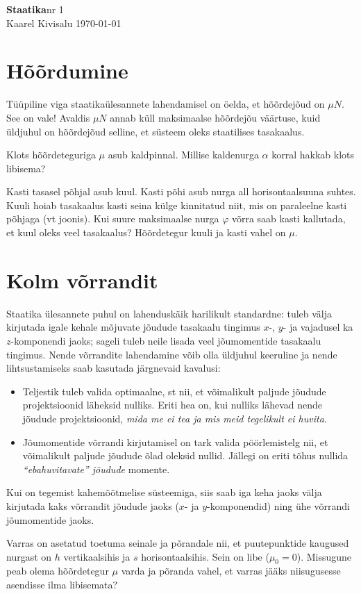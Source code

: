 \documentclass[a4paper,11pt,twocolumn]{article}
\begin{document}
{\huge \textbf{Staatika}\hfill \normalsize {nr 1}} \\
{Kaarel Kivisalu \hfill \today}

\section{Hõõrdumine}
Tüüpiline viga staatikaülesannete lahendamisel on öelda, et hõõrdejõud on $\mu N$. See on vale! Avaldis $\mu N$ annab küll maksimaalse hõõrdejõu väärtuse, kuid üldjuhul on hõõrdejõud selline, et süsteem oleks staatilises tasakaalus.
\begin{question}
Klots hõõrdeteguriga $\mu$ asub kaldpinnal. Millise kaldenurga $\alpha$ korral hakkab klots libisema?
\end{question}
\begin{question}[Lahtine 2006, V7][sta1][5cm]
	Kasti tasasel põhjal asub kuul. Kasti põhi asub nurga all horisontaalsuuna suhtes. Kuuli hoiab tasakaalus kasti seina külge kinnitatud niit, mis on paraleelne kasti põhjaga (vt joonis). Kui suure maksimaalse nurga $ \varphi $ võrra saab kasti kallutada, et kuul oleks veel tasakaalus? Hõõrdetegur kuuli ja kasti vahel on $ \mu $.
\end{question}

\section{Kolm võrrandit}
Staatika ülesannete puhul on lahenduskäik harilikult standardne: tuleb välja kirjutada igale kehale mõjuvate jõudude tasakaalu tingimus $x$-, $y$- ja vajadusel ka $z$-komponendi jaoks; sageli tuleb neile lisada veel jõumomentide tasakaalu tingimus. Nende võrrandite lahendamine  võib olla üldjuhul keeruline ja nende lihtsustamiseks saab kasutada järgnevaid kavalusi:
\begin{itemize}
	\item Teljestik tuleb valida optimaalne, st nii, et võimalikult paljude jõudude projektsioonid läheksid nulliks. Eriti hea on, kui nulliks lähevad nende jõudude projektsioonid, \textit{mida me ei tea ja mis meid tegelikult ei huvita}.
	\item Jõumomentide võrrandi kirjutamisel on tark valida pöörlemistelg nii, et võimalikult paljude jõudude õlad oleksid nullid. Jällegi on eriti tõhus nullida \textit{\enquote{ebahuvitavate} jõudude} momente.
\end{itemize}
Kui on tegemist kahemõõtmelise süsteemiga, siis saab iga keha jaoks välja kirjutada kaks võrrandit jõudude jaoks ($ x $- ja $ y $-komponendid) ning ühe võrrandi jõumomentide jaoks.
\begin{question}
	Varras on asetatud toetuma seinale ja põrandale nii, et puutepunktide kaugused nurgast on $h$ vertikaalsihis ja $s$ horisontaalsihis. Sein on libe ($\mu_0=0$). Missugune peab olema hõõrdetegur $\mu$ varda ja põranda vahel, et varras jääks niisugusesse asendisse ilma libisemata?
\end{question}
\end{document}
